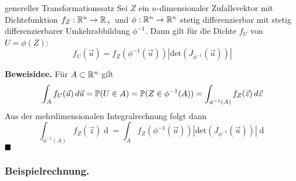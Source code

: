 \begin{mainbox}{genereller Transformationssatz}
    Sei $Z$ ein $n$-dimensionaler Zufallsvektor mit Dichtefunktion $f_Z: \R^n \to \R_+$ und $\phi: \R^n \to \R^n$ stetig differenzierbar mit stetig differenzierbarer Umkehrabbildung $\phi^{-1}$. Dann gilt für die Dichte $f_U$ von $U = \phi(Z)$:
    \[f_U(\vec{u}) = f_Z(\phi^{-1}(\vec{u}))|\text{det}(J_{\phi^{-1}}(\vec{u}))|\]
\end{mainbox}
\textbf{Beweisidee.} Für $A \subset \R^n$ gilt
\[\int_{A}f_U(\vec{u})\mathop{d\vec{u}} = \P(U \in A) = \P(Z \in \phi^{-1}(A)) = \int_{\phi^{-1}(A)}f_Z(\vec{z})\mathop{d\vec{z}}\]
Aus der mehrdimensionalen Integralrechnung folgt dann
\[\int_{\phi^{-1}(A)}f_Z(\vec{z})\mathop{d\vec{z}} = \int_{A}f_Z(\phi^{-1}(\vec{u}))|\text{det}(J_{\phi^{-1}}(\vec{u}))|\mathop{d\vec{u}}\]
$\hfill\blacksquare$
\subsubsection*{Beispielrechnung.}
